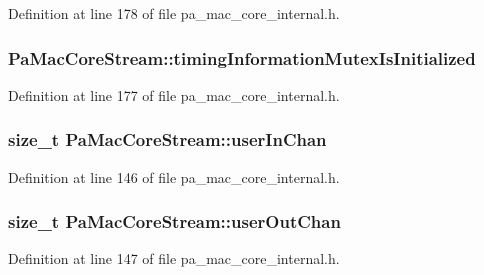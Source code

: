 Definition at line 178 of file pa\+\_\+mac\+\_\+core\+\_\+internal.\+h.

\subsubsection[{\texorpdfstring{timing\+Information\+Mutex\+Is\+Initialized}{timingInformationMutexIsInitialized}}]{ Pa\+Mac\+Core\+Stream\+::timing\+Information\+Mutex\+Is\+Initialized}\hypertarget{struct_pa_mac_core_stream_a94404e181cea0bc1d2c82b2e6f541366}{}\label{struct_pa_mac_core_stream_a94404e181cea0bc1d2c82b2e6f541366}


Definition at line 177 of file pa\+\_\+mac\+\_\+core\+\_\+internal.\+h.

\subsubsection[{\texorpdfstring{user\+In\+Chan}{userInChan}}]{\setlength{\rightskip}{0pt plus 5cm}size\+\_\+t Pa\+Mac\+Core\+Stream\+::user\+In\+Chan}\hypertarget{struct_pa_mac_core_stream_a8117390b82eb0f6aa238c1c0272f96b2}{}\label{struct_pa_mac_core_stream_a8117390b82eb0f6aa238c1c0272f96b2}


Definition at line 146 of file pa\+\_\+mac\+\_\+core\+\_\+internal.\+h.

\subsubsection[{\texorpdfstring{user\+Out\+Chan}{userOutChan}}]{\setlength{\rightskip}{0pt plus 5cm}size\+\_\+t Pa\+Mac\+Core\+Stream\+::user\+Out\+Chan}\hypertarget{struct_pa_mac_core_stream_aa672c86d838eb7f11ee03e939b7a58e5}{}\label{struct_pa_mac_core_stream_aa672c86d838eb7f11ee03e939b7a58e5}


Definition at line 147 of file pa\+\_\+mac\+\_\+core\+\_\+internal.\+h.

